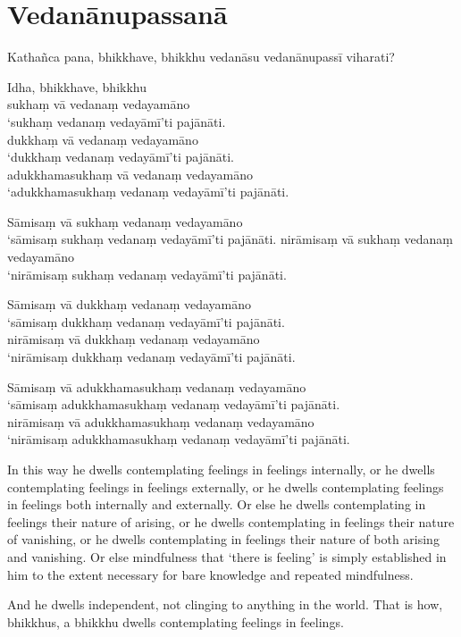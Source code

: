 \paliPage
\chapter*{Vedanānupassanā}

Kathañca pana, bhikkhave, bhikkhu vedanāsu vedanānupassī viharati?

Idha, bhikkhave, bhikkhu\\
sukhaṃ vā vedanaṃ vedayamāno\\
‘sukhaṃ vedanaṃ vedayāmī’ti pajānāti.\\
dukkhaṃ vā vedanaṃ vedayamāno\\
‘dukkhaṃ vedanaṃ vedayāmī’ti pajānāti.\\
adukkhamasukhaṃ vā vedanaṃ vedayamāno\\
‘adukkhamasukhaṃ vedanaṃ vedayāmī’ti pajānāti.

Sāmisaṃ vā sukhaṃ vedanaṃ vedayamāno\\
‘sāmisaṃ sukhaṃ vedanaṃ vedayāmī’ti pajānāti.
nirāmisaṃ vā sukhaṃ vedanaṃ vedayamāno\\
‘nirāmisaṃ sukhaṃ vedanaṃ vedayāmī’ti pajānāti.

Sāmisaṃ vā dukkhaṃ vedanaṃ vedayamāno\\
‘sāmisaṃ dukkhaṃ vedanaṃ vedayāmī’ti pajānāti.\\
nirāmisaṃ vā dukkhaṃ vedanaṃ vedayamāno\\
‘nirāmisaṃ dukkhaṃ vedanaṃ vedayāmī’ti pajānāti.

Sāmisaṃ vā adukkhamasukhaṃ vedanaṃ vedayamāno\\
‘sāmisaṃ adukkhamasukhaṃ vedanaṃ vedayāmī’ti pajānāti.\\
nirāmisaṃ vā adukkhamasukhaṃ vedanaṃ vedayamāno\\
‘nirāmisaṃ adukkhamasukhaṃ vedanaṃ vedayāmī’ti pajānāti.

\englishPage

In this way he dwells contemplating feelings in feelings internally, or he
dwells contemplating feelings in feelings externally, or he dwells contemplating
feelings in feelings both internally and externally. Or else he dwells
contemplating in feelings their nature of arising, or he dwells contemplating in
feelings their nature of vanishing, or he dwells contemplating in feelings their
nature of both arising and vanishing. Or else mindfulness that ‘there is
feeling’ is simply established in him to the extent necessary for bare knowledge
and repeated mindfulness.

And he dwells independent, not clinging to anything in the world. That is how,
bhikkhus, a bhikkhu dwells contemplating feelings in feelings.

